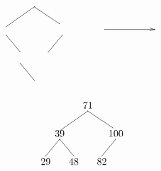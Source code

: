 \documentclass[10pt,a4paper,spanish]{report}
\begin{document}
\begin{enumerate}
\begin{minipage}{0.5\textwidth}
\[\begin{xy}
      \ar@{->} (25,-10);(43,-10)
      \ar@{-} (0,-2);(-10,-9) %
      \ar@{-} (0,-2);(9,-8) %
      \ar@{-} (10,-12);(5,-18)
      \ar@{-} (-10,-12);(-5,-18)
      \ar@{-} (-5,-22);(0,-28)
      \end{xy}\]
      \end{minipage}
      \begin{minipage}{0.5\textwidth}
      \[\begin{xy}
      ,(0,0)*+=<10mm>[]\txt<2cm>{71}
      ,(-10,-10)*+=<10mm>[]\txt<2cm>{39}
      ,(10,-10)*+=<10mm>[]\txt<2cm>{100}
      ,(-15,-20)*+=<10mm>[]\txt<2cm>{29}
      ,(-5,-20)*+=<10mm>[]\txt<2cm>{48}
      ,(5,-20)*+=<10mm>[]\txt<2cm>{82}

      \ar@{-} (0,-2);(-10,-9) %
      \ar@{-} (0,-2);(9,-8) %
      \ar@{-} (-10,-12);(-15,-18) 
      \ar@{-} (10,-12);(5,-18)
      \ar@{-} (-10,-12);(-5,-18)
      \end{xy}\]
      \end{minipage}


\end{enumerate}
\end{document}
